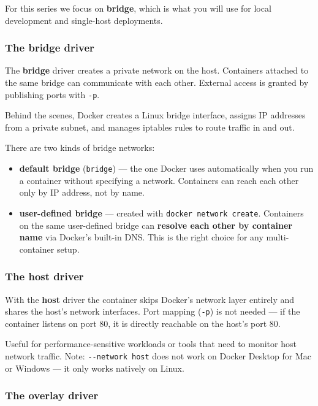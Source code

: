 \documentclass[11pt,american,a4paper,openany]{book}
\providecommand{\tightlist}{%
  \setlength{\itemsep}{2pt}\setlength{\parskip}{0pt}}
\begin{document}
For this series we focus on \textbf{bridge}, which is what you will use
for local development and single-host deployments.

\subsubsection{The bridge driver}\label{the-bridge-driver}

The \textbf{bridge} driver creates a private network on the host.
Containers attached to the same bridge can communicate with each other.
External access is granted by publishing ports with \texttt{-p}.

Behind the scenes, Docker creates a Linux bridge interface, assigns IP
addresses from a private subnet, and manages iptables rules to route
traffic in and out.

There are two kinds of bridge networks:

\begin{itemize}
\tightlist
\item
  \textbf{default bridge} (\texttt{bridge}) --- the one Docker uses
  automatically when you run a container without specifying a network.
  Containers can reach each other only by IP address, not by name.
\item
  \textbf{user-defined bridge} --- created with
  \texttt{docker\ network\ create}. Containers on the same user-defined
  bridge can \textbf{resolve each other by container name} via Docker's
  built-in DNS. This is the right choice for any multi-container setup.
\end{itemize}

\subsubsection{The host driver}\label{the-host-driver}

With the \textbf{host} driver the container skips Docker's network layer
entirely and shares the host's network interfaces. Port mapping
(\texttt{-p}) is not needed --- if the container listens on port 80, it
is directly reachable on the host's port 80.

Useful for performance-sensitive workloads or tools that need to monitor
host network traffic. Note: \texttt{-\/-network\ host} does not work on
Docker Desktop for Mac or Windows --- it only works natively on Linux.

\subsubsection{The overlay driver}\label{the-overlay-driver}
\end{document}
